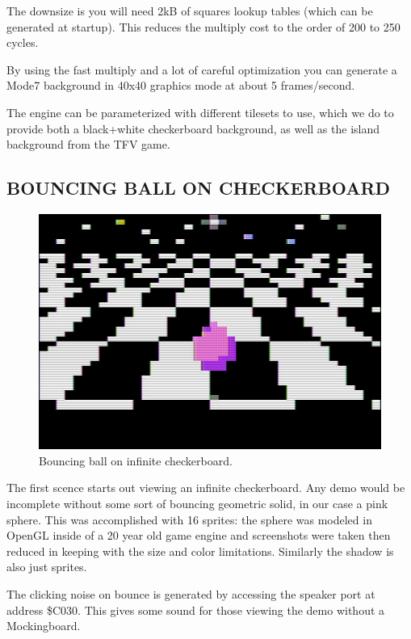 \documentclass[twocolumn]{article}
\begin{document}
  The downsize is you will need 2kB of squares lookup tables (which can
  be generated at startup).  This reduces the multiply cost to the order
  of 200 to 250 cycles.

  By using the fast multiply and a lot of careful optimization you can
  generate a Mode7 background in 40x40 graphics mode at about 5 frames/second.

  The engine can be parameterized with different tilesets to use, which we
  do to provide both a black+white checkerboard background, as well as the
  island background from the TFV game.

\subsection{BOUNCING BALL ON CHECKERBOARD}

\begin{figure}
\begin{center}
\includegraphics[width=\columnwidth]{figures/m7_screen1.jpg}
\caption{Bouncing ball on infinite checkerboard.\label{fig:ball}}
\end{center}
\end{figure}

The first scence starts out viewing an infinite checkerboard.
Any demo would be incomplete without some sort of bouncing geometric solid,
in our case a pink sphere.
This was accomplished with 16 sprites:
the sphere was modeled in OpenGL inside of a 20 year old game engine
and screenshots were taken then reduced in keeping with the size and
color limitations.
Similarly the shadow is also just sprites.

The clicking noise on bounce is generated by accessing the speaker port
at address \$C030.
This gives some sound for those viewing the demo without a Mockingboard.
\end{document}
